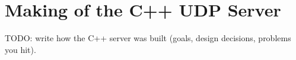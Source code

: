 \documentclass[11pt]{article}
\begin{document}
\section{Making of the C++ UDP Server}
TODO: write how the C++ server was built (goals, design decisions, problems you hit).
\end{document}
